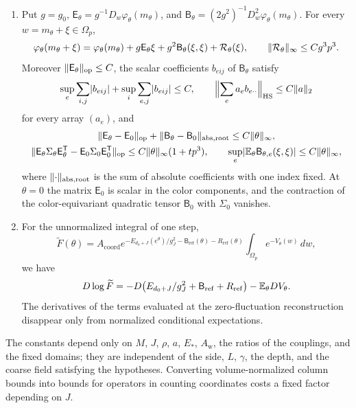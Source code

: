 \begin{theorem}
\begin{enumerate}
\begin{gather*}
 \norm{\Sigma_\theta-\Sigma_0}_{b',\mathrm{row+col}}\le Ctp^3\norm\theta_\infty,\qquad
 \norm{\Sigma_\theta}_{\mathrm{op}}\le2,
\end{gather*}
for a fixed $b'>0$. Here $\Sigma_0=\Sigma_{\mathrm{sp}}\otimes I_3$ is the covariance of the conditional fluctuation kernel at the identity coarse field; this kernel is interacting and truncated, and $\Sigma_{\mathrm{sp}}$ includes all its spatial covariances.
\item Put $g=g_0$, $\mathsf E_\theta=g^{-1}D_w\varphi_\theta(m_\theta)$, and $\mathsf B_\theta=(2g^2)^{-1}D_w^2\varphi_\theta(m_\theta)$. For every $w=m_\theta+\xi\in\Omega_p$,
\[
 \varphi_\theta(m_\theta+\xi)=\varphi_\theta(m_\theta)+g\mathsf E_\theta\xi+g^2\mathsf B_\theta(\xi,\xi)+\mathcal R_\theta(\xi),\qquad \lVert \mathcal R_\theta\rVert_\infty\le Cg^3p^3.
\]
Moreover $\lVert \mathsf E_\theta\rVert_{\mathrm{op}}\le C$, the scalar coefficients $b_{eij}$ of $\mathsf B_\theta$ satisfy
\[
 \sup_e\sum_{i,j}\lvert b_{eij}\rvert+\sup_i\sum_{e,j}\lvert b_{eij}\rvert\le C,\qquad \Bigl\lVert\sum_ea_eb_{e\cdot\cdot}\Bigr\rVert_{\mathrm{HS}}\le C\lVert a\rVert_2
\]
for every array $(a_e)$, and
\[
 \begin{gathered}
 \lVert \mathsf E_\theta-\mathsf E_0\rVert_{\mathrm{op}}+\lVert \mathsf B_\theta-\mathsf B_0\rVert_{\mathrm{abs,root}}\le C\lVert \theta\rVert_\infty,\\
 \lVert \mathsf E_\theta\Sigma_\theta\mathsf E_\theta^{\mathsf T}-\mathsf E_0\Sigma_0\mathsf E_0^{\mathsf T}\rVert_{\mathrm{op}}\le C\lVert \theta\rVert_\infty(1+tp^3),\qquad
 \sup_e\lvert \mathbb E_\theta\mathsf B_{\theta,e}(\xi,\xi)\rvert\le C\lVert \theta\rVert_\infty,
 \end{gathered}
\]
where $\lVert \cdot\rVert_{\mathrm{abs,root}}$ is the sum of absolute coefficients with one index fixed. At $\theta=0$ the matrix $\mathsf E_0$ is scalar in the color components, and the contraction of the color-equivariant quadratic tensor $\mathsf B_0$ with $\Sigma_0$ vanishes.
\item For the unnormalized integral of one step,
\[
 \widetilde F(\theta)=A_{\mathrm{coord}}e^{-E_{d_0+J}(e^\theta)/g_J^2-\mathsf B_{\mathrm{ref}}(\theta)-R_{\mathrm{ref}}(\theta)}\int_{\Omega_p}e^{-V_\theta(w)}\,dw,
\]
we have
\[
 D\log\widetilde F=-D\bigl(E_{d_0+J}/g_J^2+\mathsf B_{\mathrm{ref}}+R_{\mathrm{ref}}\bigr)-\mathbb E_\theta DV_\theta.
\]
The derivatives of the terms evaluated at the zero-fluctuation reconstruction disappear only from normalized conditional expectations.
\end{enumerate}
The constants depend only on $M$, $J$, $\rho$, $a$, $E_*$, $A_{\mathrm w}$, the ratios of the couplings, and the fixed domains; they are independent of the side, $L$, $\gamma$, the depth, and the coarse field satisfying the hypotheses. Converting volume-normalized column bounds into bounds for operators in counting coordinates costs a fixed factor depending on $J$.
\end{theorem}


